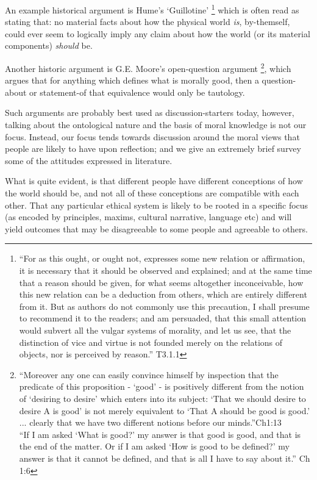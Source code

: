An example historical argument is Hume's `Guillotine' \citep{HumeGutenberg}\footnote{``For as this ought, or ought not, expresses some new relation or affirmation, it is necessary that it should be observed and explained; and at the same time that a reason should be given, for what seems altogether inconceivable, how this new relation can be a deduction from others, which are entirely different from it. But as authors do not commonly use this precaution, I shall presume to recommend it to the readers; and am persuaded, that this small attention would subvert all the vulgar systems of morality, and let us see, that the distinction of vice and virtue is not founded merely on the relations of objects, nor is perceived by reason.'' T3.1.1} which is often read as stating that: no material facts about how the physical world \textit{is}, by-themself, could ever seem to logically imply any claim about how the world (or its material components) \textit{should} be.

Another historic argument is G.E. Moore's open-question argument \citep{MooreGutenberg}\footnote{
``Moreover any one can easily convince himself by inspection that the predicate of this proposition - `good' - is positively different from the notion of `desiring to desire' which enters into its subject: `That we should desire to desire A is good' is not merely equivalent to `That A should be good is good.' ... clearly that we have two different notions before our minds.''Ch1:13\\
``If I am asked `What is good?' my answer is that good is good, and that is the end of the matter. Or if I am asked `How is good to be defined?' my answer is that it cannot be defined, and that is all I have to say about it.'' Ch 1:6}, which argues that for anything which defines what is morally good, then a question-about or statement-of that equivalence would only be tautology.

Such arguments are probably best used as discussion-starters today, however, talking about the ontological nature and the basis of moral knowledge is not our focus.
Instead, our focus tends towards discussion around the moral views that people are likely to have upon reflection; and we give an extremely brief survey some of the attitudes expressed in literature.

What is quite evident, is that different people have different conceptions of how the world should be, and not all of these conceptions are compatible with each other.
That any particular ethical system is likely to be rooted in a specific focus (as encoded by principles, maxims, cultural narrative, language etc) and will yield outcomes that may be disagreeable to some people and agreeable to others.

